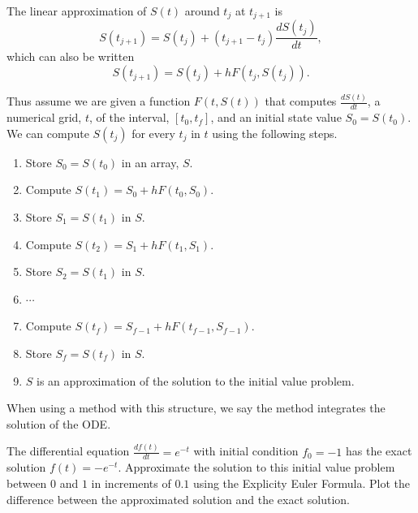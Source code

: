 The linear approximation of $S(t)$ around $t_j$ at $t_{j+1}$ is
\[S(t_{j+1}) = S(t_j) + (t_{j+1} - t_j)\frac{dS(t_j)}{dt},\]
which can also be written
\[S(t_{j+1}) = S(t_j) + hF(t_j, S(t_j)).\]

Thus assume we are given a function $F(t,S(t))$ that computes $\frac{dS(t)}{dt}$, a numerical grid, $t$, of the interval, $[t_0,t_f]$, and an initial state value $S_0=S(t_0)$. We can compute $S(t_j)$ for every $t_j$ in $t$ using the following steps.
\begin{enumerate}[label=\arabic*.]
\item Store $S_0=S(t_0)$ in an array, $S$.
\item Compute $S(t_1)=S_0+hF(t_0,S_0)$.
\item Store $S_1=S(t_1)$ in $S$.
\item Compute $S(t_2)=S_1+hF(t_1,S_1)$.
\item Store $S_2=S(t_1)$ in $S$.
\item $\cdots$
\item Compute $S(t_f)=S_{f-1}+hF(t_{f-1},S_{f-1})$.
\item Store $S_f=S(t_f)$ in $S$.
\item $S$ is an approximation of the solution to the initial value problem.
\end{enumerate}
When using a method with this structure, we say the method integrates the solution of the ODE.
\begin{example}
The differential equation $\frac{df(t)}{dt}=e^{-t}$ with initial condition $f_0=-1$ has the exact solution $f(t)=-e^{-t}$. Approximate the solution to this initial value problem between $0$ and $1$ in increments of $0.1$ using the Explicity Euler Formula. Plot the difference between the approximated solution and the exact solution.
\end{example}

